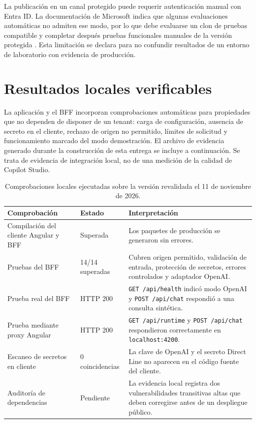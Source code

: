 \documentclass[12pt,twoside,titlepage]{book}
\begin{document}
La publicaci\'on en un canal protegido puede requerir autenticaci\'on manual con Entra ID. La documentaci\'on de Microsoft indica que algunas evaluaciones autom\'aticas no admiten ese modo, por lo que debe evaluarse un clon de pruebas compatible y completar despu\'es pruebas funcionales manuales de la versi\'on protegida \cite{copilotEvaluation,copilotSso}. Esta limitaci\'on se declara para no confundir resultados de un entorno de laboratorio con evidencia de producci\'on.

\section{Resultados locales verificables}

La aplicaci\'on y el BFF incorporan comprobaciones autom\'aticas para propiedades que no dependen de disponer de un tenant: carga de configuraci\'on, ausencia de secreto en el cliente, rechazo de origen no permitido, l\'imites de solicitud y funcionamiento marcado del modo demostraci\'on. El archivo de evidencia generado durante la construcci\'on de esta entrega se incluye a continuaci\'on. Se trata de evidencia de integraci\'on local, no de una medici\'on de la calidad de Copilot Studio.


\begin{table}[H]
\centering
\small
\caption{Comprobaciones locales ejecutadas sobre la versi\'on revalidada el 11 de noviembre de 2026.}
\label{tab:resultados-locales}
\begin{tabularx}{\textwidth}{p{}p{}X}
\toprule
\textbf{Comprobaci\'on} & \textbf{Estado} & \textbf{Interpretaci\'on}\\
\midrule
Compilaci\'on del cliente Angular y BFF & Superada & Los paquetes de producci\'on se generaron sin errores.\\
Pruebas del BFF & 14/14 superadas & Cubren origen permitido, validaci\'on de entrada, protecci\'on de secretos, errores controlados y adaptador OpenAI.\\
Prueba real del BFF & HTTP 200 & \texttt{GET /api/health} indic\'o modo OpenAI y \texttt{POST /api/chat} respondi\'o a una consulta sint\'etica.\\
Prueba mediante proxy Angular & HTTP 200 & \texttt{GET /api/runtime} y \texttt{POST /api/chat} respondieron correctamente en \texttt{localhost:4200}.\\
Escaneo de secretos en cliente & 0 coincidencias & La clave de OpenAI y el secreto Direct Line no aparecen en el c\'odigo fuente del cliente.\\
Auditor\'ia de dependencias & Pendiente & La evidencia local registra dos vulnerabilidades transitivas altas que deben corregirse antes de un despliegue p\'ublico.\\
\bottomrule
\end{tabularx}
\end{table}
\end{document}
